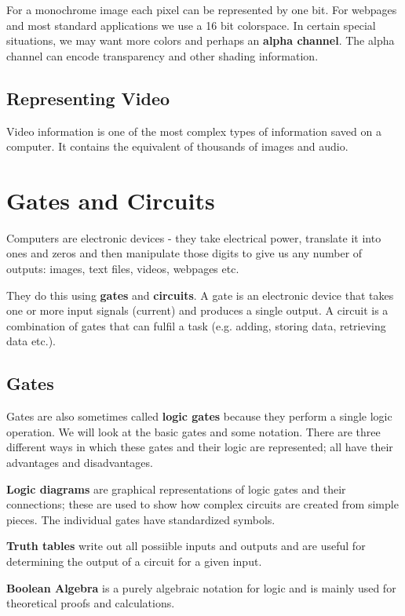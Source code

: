 \documentclass[11pt,a4paper]{report}
\newcommand{\bfb}[1]{{\bf \color{blue} #1}}
\begin{document}
For a monochrome image each pixel can be represented by one bit. For webpages and most standard applications we use a 16 bit colorspace. In  certain special situations, we may want more colors and perhaps an \bfb{alpha channel}. The alpha channel can encode transparency and other shading information.

\subsection{Representing Video}

Video information is one of the most complex types of information saved on a computer. It contains the equivalent of thousands of images and audio. 

\newpage

\section{Gates and Circuits}

Computers are electronic devices - they take electrical power, translate it into ones and zeros and then manipulate those digits to give us any number of outputs: images, text files, videos, webpages etc. 

They do this using \bfb{gates} and \bfb{circuits}. A gate is an electronic device that takes one or more input signals (current) and produces a single output. A circuit is a combination of gates that can fulfil a task (e.g. adding, storing data, retrieving data etc.).

\subsection{Gates}

Gates are also  sometimes called \bfb{logic gates} because they perform a single logic operation. We will look at the basic gates and some notation. There are three different ways in which these gates and their logic are represented; all have their advantages and disadvantages. 


\bfb{Logic diagrams} are graphical representations of logic gates and their connections; these are used to show how complex circuits are created from simple pieces. The individual gates have standardized symbols.

\bfb{Truth tables} write out all possiible inputs and outputs and are useful for determining the output of a circuit for a given input.

\bfb{Boolean Algebra} is a purely algebraic notation for logic and is mainly used for theoretical proofs and calculations. 
\end{document}
